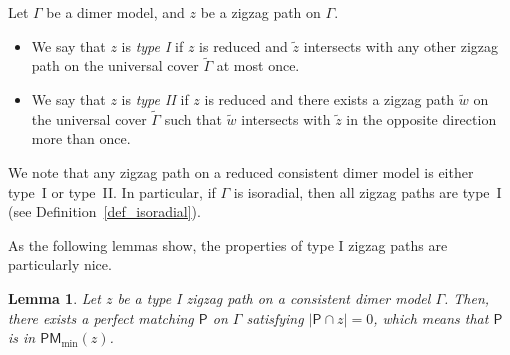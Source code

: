 \documentclass[11pt]{article}
\numberwithin{equation}{section}
\numberwithin{equation}{section}
\numberwithin{figure}{section}
\numberwithin{table}{section}
\newtheorem{Lemma}[Theorem]{Lemma}
\newcommand{\sfP}{\mathsf{P}}
\newcommand{\PM}{\mathsf{PM}}
\begin{document}
\begin{Definition}\label{def_zigzag_type}
Let $\Gamma$ be a dimer model, and $z$ be a zigzag path on $\Gamma$.
\begin{itemize}\itemsep=0pt
\item[(1)] We say that $z$ is \emph{type I} if $z$ is reduced and $\widetilde{z}$ intersects with any other zigzag path on the universal cover $\widetilde{\Gamma}$ at most once.
\item[(2)] We say that $z$ is \emph{type II} if $z$ is reduced and there exists a zigzag path $\widetilde{w}$ on the universal cover $\widetilde{\Gamma}$ such that $\widetilde{w}$ intersects with $\widetilde{z}$ in the opposite direction more than once.
\end{itemize}
We note that any zigzag path on a reduced consistent dimer model is either type~I or type~II.
In particular, if $\Gamma$ is isoradial, then all zigzag paths are type~I (see Definition~\ref{def_isoradial}).
\end{Definition}

As the following lemmas show, the properties of type I zigzag paths are particularly nice.

\begin{Lemma}\label{lem_existence_pm}
Let $z$ be a type I zigzag path on a consistent dimer model $\Gamma$.
Then, there exists a perfect matching $\sfP$ on $\Gamma$ satisfying $|\sfP\cap z|=0$, which means that $\sfP$ is in $\PM_{\min}(z)$.
\end{Lemma}
\end{document}
